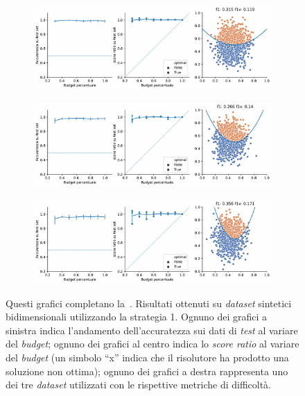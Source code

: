\begin{appendices}
\begin{figure}[b!]
    \centering
    \begin{subfigure}{.8\textwidth}
        \centering
        \includegraphics[width=\textwidth]{img/2d/1.pdf}
    \end{subfigure}%
    \hfill
    \begin{subfigure}{.8\textwidth}
        \centering
        \includegraphics[width=\textwidth]{img/2d/2.pdf}
    \end{subfigure}%
    \hfill
    \begin{subfigure}{.8\textwidth}
        \centering
        \includegraphics[width=\textwidth]{img/2d/3.pdf}
    \end{subfigure}%
    \caption[Risultati su \emph{dataset} sintetici utilizzando la strategia 1.]{Questi grafici completano la~. Risultati ottenuti su \emph{dataset} sintetici bidimensionali utilizzando la strategia 1. Ognuno dei grafici a sinistra indica l'andamento dell'accuratezza sui dati di \emph{test} al variare del \emph{budget}; ognuno dei grafici al centro indica lo \emph{score ratio} al variare del \emph{budget} (un simbolo ``x'' indica che il risolutore ha prodotto una soluzione non ottima); ognuno dei grafici a destra rappresenta uno dei tre \emph{dataset} utilizzati con le rispettive metriche di difficoltà.}

\end{figure}
\end{appendices}

